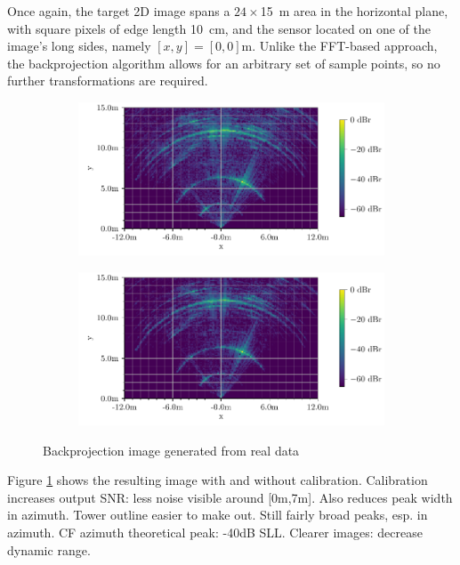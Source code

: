 Once again, the target 2D image spans a $24 \times$\SI{15}{\m} area in the horizontal plane,
with square pixels of edge length \SI{10}{\cm},
and the sensor located on one of the image's long sides, namely $[x,y] = [0,0]$m.
Unlike the FFT-based approach,
the backprojection algorithm allows for an arbitrary set of sample points,
so no further transformations are required.\\
\begin{figure}[t]
    \centering
    \begin{subfigure}[t]{0.8\textwidth}
        \includegraphics[width=\textwidth]{../figures/testimg_uncalibrated_bp.pdf}
    \end{subfigure}
    \begin{subfigure}[t]{0.8\textwidth}
        \includegraphics[width=\textwidth]{../figures/testimg_calibrated_bp.pdf}
    \end{subfigure}
    \caption{Backprojection image generated from real data}
    \label{fig:bp_testimg}
\end{figure}
Figure \ref{fig:bp_testimg} shows the resulting image with and without calibration.
Calibration increases output SNR: less noise visible around [0m,7m].
Also reduces peak width in azimuth. Tower outline easier to make out.
Still fairly broad peaks, esp. in azimuth.
CF azimuth theoretical peak: -40dB SLL. Clearer images: decrease dynamic range.


